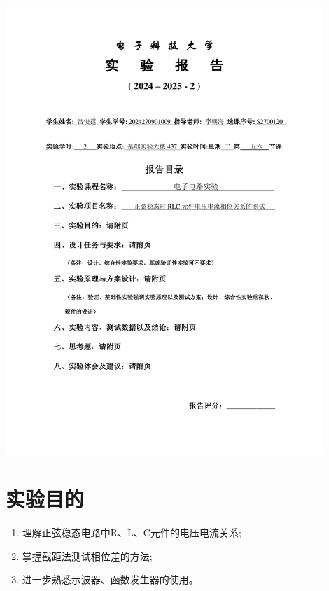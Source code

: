 \documentclass[10pt, a4paper]{article} %
\begin{document}
\begin{titlepage}
    \centering
    \includegraphics[page=1, width=0.9\textwidth, keepaspectratio]{image/实验报告撰写封面.pdf}
    \restoregeometry
\end{titlepage}

\setcounter{section}{2}

\section{实验目的}

\begin{enumerate}[leftmargin=50pt,label=(\arabic*)] %
    \item 理解正弦稳态电路中R、L、C元件的电压电流关系; 
    \item 掌握截距法测试相位差的方法; 
    \item 进一步熟悉示波器、函数发生器的使用。
\end{enumerate}
\end{document}
